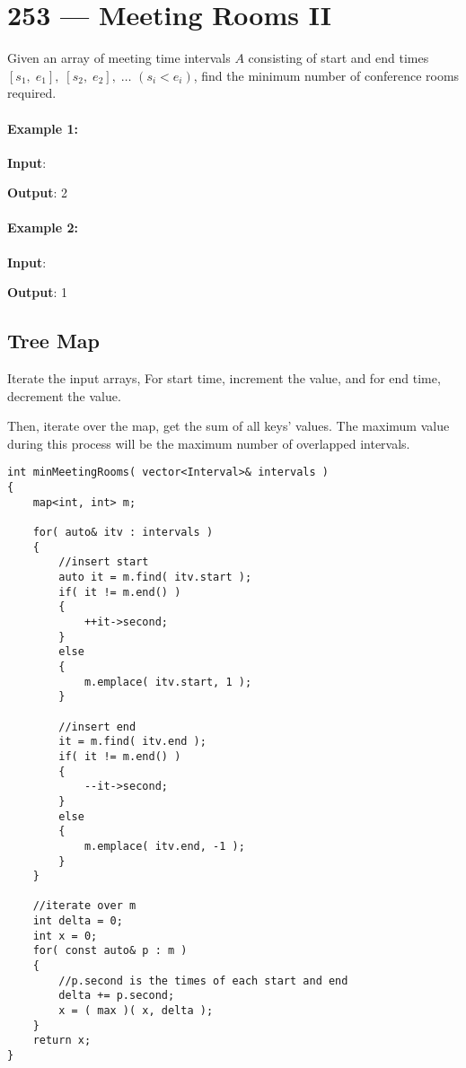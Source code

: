 \section{253 --- Meeting Rooms II}
Given an array of meeting time intervals $A$ consisting of start and end times $[s_1,\;e_1],\;[s_2,\;e_2],\;\ldots$ $(s_i < e_i)$, find the minimum number of conference rooms required.


\paragraph{Example 1:}

\begin{flushleft}
\textbf{Input}: \fcj{[[0, 30],[5, 10],[15, 20]]}

\textbf{Output}: 2

\end{flushleft}

\paragraph{Example 2:}

\begin{flushleft}
\textbf{Input}: \fcj{[[7,10],[2,4]]}

\textbf{Output}: 1
\end{flushleft}

\subsection{Tree Map}
Iterate the input arrays, For start time, increment the value, and for end time, decrement the value. 

Then, iterate over the map, get the sum of all keys' values. The maximum value during this process will be the maximum number of overlapped intervals.

\setcounter{lstlisting}{0}
\begin{lstlisting}[style=customc, caption={Tree Map}]
int minMeetingRooms( vector<Interval>& intervals )
{
    map<int, int> m;

    for( auto& itv : intervals )
    {
        //insert start
        auto it = m.find( itv.start );
        if( it != m.end() )
        {
            ++it->second;
        }
        else
        {
            m.emplace( itv.start, 1 );
        }

        //insert end
        it = m.find( itv.end );
        if( it != m.end() )
        {
            --it->second;
        }
        else
        {
            m.emplace( itv.end, -1 );
        }
    }

    //iterate over m
    int delta = 0;
    int x = 0;
    for( const auto& p : m )
    {
        //p.second is the times of each start and end
        delta += p.second;
        x = ( max )( x, delta );
    }
    return x;
}
\end{lstlisting}

